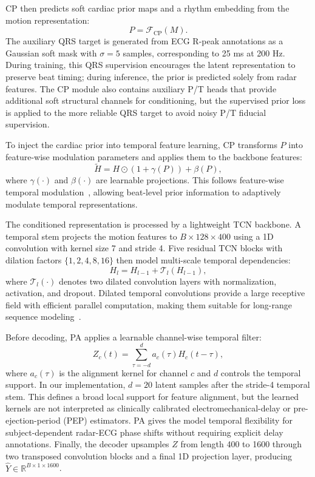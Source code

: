 \documentclass[runningheads]{llncs}
\begin{document}
CP then predicts soft cardiac prior maps and a rhythm embedding from the motion representation:
\begin{equation}
    P=\mathcal{F}_{\mathrm{CP}}(M).
\end{equation}
The auxiliary QRS target is generated from ECG R-peak annotations as a Gaussian soft mask with $\sigma=5$ samples, corresponding to 25 ms at 200 Hz. During training, this QRS supervision encourages the latent representation to preserve beat timing; during inference, the prior is predicted solely from radar features. The CP module also contains auxiliary P/T heads that provide additional soft structural channels for conditioning, but the supervised prior loss is applied to the more reliable QRS target to avoid noisy P/T fiducial supervision.

To inject the cardiac prior into temporal feature learning, CP transforms $P$ into feature-wise modulation parameters and applies them to the backbone features:
\begin{equation}
    \tilde{H}=H\odot(1+\gamma(P))+\beta(P),
\end{equation}
where $\gamma(\cdot)$ and $\beta(\cdot)$ are learnable projections. This follows feature-wise temporal modulation~\cite{FiLM}, allowing beat-level prior information to adaptively modulate temporal representations.

The conditioned representation is processed by a lightweight TCN backbone. A temporal stem projects the motion features to $B\times128\times400$ using a 1D convolution with kernel size 7 and stride 4. Five residual TCN blocks with dilation factors $\{1,2,4,8,16\}$ then model multi-scale temporal dependencies:
\begin{equation}
    H_l = H_{l-1}+\mathcal{T}_l(H_{l-1}),
\end{equation}
where $\mathcal{T}_l(\cdot)$ denotes two dilated convolution layers with normalization, activation, and dropout. Dilated temporal convolutions provide a large receptive field with efficient parallel computation, making them suitable for long-range sequence modeling~\cite{bai2018tcn}.

Before decoding, PA applies a learnable channel-wise temporal filter:
\begin{equation}
    Z_c(t)=\sum_{\tau=-d}^{d} a_c(\tau)H_c(t-\tau),
\end{equation}
where $a_c(\tau)$ is the alignment kernel for channel $c$ and $d$ controls the temporal support. In our implementation, $d=20$ latent samples after the stride-4 temporal stem. This defines a broad local support for feature alignment, but the learned kernels are not interpreted as clinically calibrated electromechanical-delay or pre-ejection-period (PEP) estimators. PA gives the model temporal flexibility for subject-dependent radar-ECG phase shifts without requiring explicit delay annotations. Finally, the decoder upsamples $Z$ from length 400 to 1600 through two transposed convolution blocks and a final 1D projection layer, producing $\hat{Y}\in\mathbb{R}^{B\times1\times1600}$.
\end{document}
